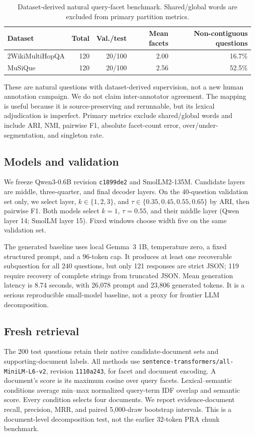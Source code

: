 \documentclass[11pt]{article}
\begin{document}
\begin{table}[t]
\centering
\small
\caption{Dataset-derived natural query-facet benchmark. Shared/global words are excluded from primary partition metrics.}
\label{tab:benchmark}
\begin{tabular}{lrrrr}
\toprule
Dataset & Total & Val./test & Mean facets & Non-contiguous questions\\
\midrule
2WikiMultiHopQA & 120 & 20/100 & 2.00 & 16.7\%\\
MuSiQue & 120 & 20/100 & 2.56 & 52.5\%\\
\bottomrule
\end{tabular}
\end{table}

These are natural questions with dataset-derived supervision, not a new human annotation campaign. We do not claim inter-annotator agreement. The mapping is useful because it is source-preserving and rerunnable, but its lexical adjudication is imperfect. Primary metrics exclude shared/global words and include ARI, NMI, pairwise F1, absolute facet-count error, over/under-segmentation, and singleton rate.

\subsection{Models and validation}
We freeze Qwen3-0.6B revision \texttt{c1899de2} and SmolLM2-135M. Candidate layers are middle, three-quarter, and final decoder layers. On the 40-question validation set only, we select layer, $k\in\{1,2,3\}$, and $\tau\in\{0.35,0.45,0.55,0.65\}$ by ARI, then pairwise F1. Both models select $k=1$, $\tau=0.55$, and their middle layer (Qwen layer 14; SmolLM layer 15). Fixed windows choose width five on the same validation set.

The generated baseline uses local Gemma~3 1B, temperature zero, a fixed structured prompt, and a 96-token cap. It produces at least one recoverable subquestion for all 240 questions, but only 121 responses are strict JSON; 119 require recovery of complete strings from truncated JSON. Mean generation latency is 8.74 seconds, with 26,078 prompt and 23,806 generated tokens. It is a serious reproducible small-model baseline, not a proxy for frontier LLM decomposition.

\subsection{Fresh retrieval}
The 200 test questions retain their native candidate-document sets and supporting-document labels. All methods use \texttt{sentence-transformers/all-MiniLM-L6-v2}, revision \texttt{1110a243}, for facet and document encoding. A document's score is its maximum cosine over query facets. Lexical--semantic conditions average min--max normalized query-term IDF overlap and semantic score. Every condition selects four documents. We report evidence-document recall, precision, MRR, and paired 5,000-draw bootstrap intervals. This is a document-level decomposition test, not the earlier 32-token PRA chunk benchmark.
\end{document}
